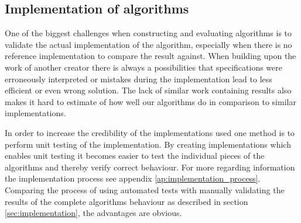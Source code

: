 \subsection{Implementation of algorithms}

One of the biggest challenges when constructing and evaluating algorithms is to
validate the actual implementation of the algorithm, especially when there is
no reference implementation to compare the result against. When building upon
the work of another creator there is always a possibilities that specifications
were erroneously interpreted or mistakes during the implementation lead to less
efficient or even wrong solution. The lack of similar work containing results
also makes it hard to estimate of how well our algorithms do in
comparison to similar implementations.

In order to increase the credibility of the implementations used one method is
to perform unit testing of the implementation. By creating implementations
which enables unit testing it becomes easier to test the individual pieces of
the algorithms and thereby verify correct behaviour. For more regarding
information the implementation process see appendix
\ref{ap:implementation_process}. Comparing the process of using automated tests
with manually validating the results of the complete algorithms behaviour as
described in section \ref{sec:implementation}, the advantages are obvious.
